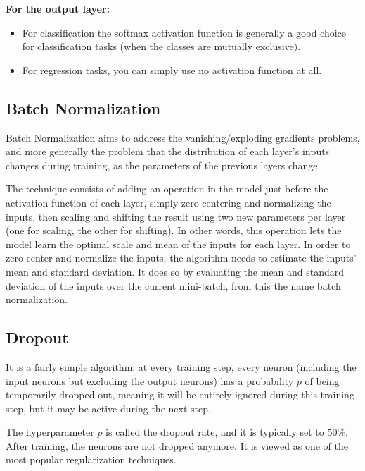 \documentclass[%
oneside,                 %
final,                   %
10pt]{article}
\begin{document}
\textbf{For the output layer:}

\begin{itemize}
\item For classification the softmax activation function is generally a good choice for classification tasks (when the classes are mutually exclusive).

\item For regression tasks, you can simply use no activation function at all.
\end{itemize}

\noindent
\subsection{Batch Normalization}

Batch Normalization aims to address the vanishing/exploding gradients
problems, and more generally the problem that the distribution of each
layer’s inputs changes during training, as the parameters of the
previous layers change.

The technique consists of adding an operation in the model just before
the activation function of each layer, simply zero-centering and
normalizing the inputs, then scaling and shifting the result using two
new parameters per layer (one for scaling, the other for shifting). In
other words, this operation lets the model learn the optimal scale and
mean of the inputs for each layer.  In order to zero-center and
normalize the inputs, the algorithm needs to estimate the inputs’ mean
and standard deviation. It does so by evaluating the mean and standard
deviation of the inputs over the current mini-batch, from this the
name batch normalization.

\subsection{Dropout}

It is a fairly simple algorithm: at every training step, every neuron
(including the input neurons but excluding the output neurons) has a
probability $p$ of being temporarily dropped out, meaning it will be
entirely ignored during this training step, but it may be active
during the next step.

The hyperparameter $p$ is called the dropout rate, and it is typically
set to 50\%. After training, the neurons are not dropped anymore.  It
is viewed as one of the most popular regularization techniques.
\end{document}

